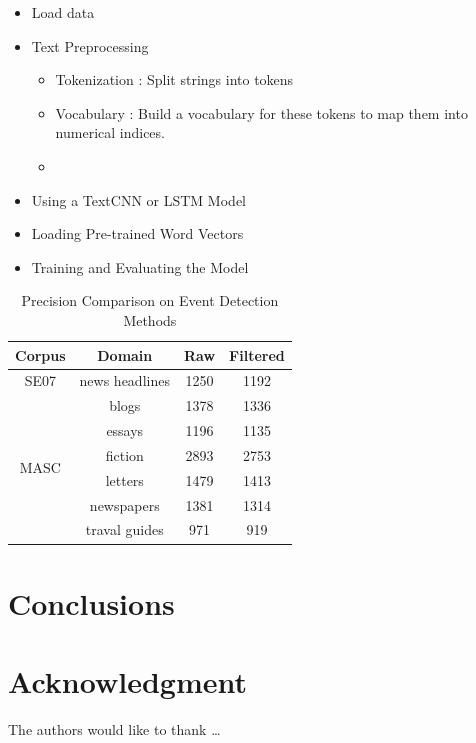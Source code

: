 \begin{itemize}
	
	\item 
	Load data
	\item 
	Text Preprocessing
	
	\begin{itemize}
		\item 
		Tokenization : Split strings into tokens
		\item 
		Vocabulary : Build a vocabulary for these tokens to map them into numerical indices.
		\item 
		
	\end{itemize}
	
	\item 
	Using a TextCNN or LSTM Model
	
	\item 
	Loading Pre-trained Word Vectors
	
	\item 
	Training and Evaluating the Model
	
\end{itemize}




\begin{table} [htbp] \centering
  \caption{Precision Comparison on Event Detection Methods}
  \label{tbl:overall-experiments}
  \begin{tabular}{cccc}
\toprule
Corpus & Domain  & Raw & Filtered  \\
\midrule
SE07 &  news headlines &  1250 &  1192 \\
\hline
\multirow{6}{*}{MASC} &  blogs&  1378&  1336\\
&  essays &  1196 &  1135 \\
&  fiction &  2893 &  2753 \\
&  letters &  1479 &  1413 \\
& newspapers & 1381 & 1314 \\
& traval guides & 971 & 919 \\
\bottomrule
\end{tabular}
\end{table}



\section{Conclusions} \label{sec-conclusions}



\section*{Acknowledgment}

\lipsum[1]


The authors would like to thank \ldots


